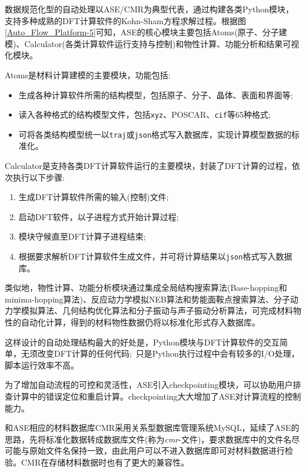 数据规范化型的自动处理以\textrm{ASE/CMR}为典型代表，通过构建各类\textrm{Python}模块，支持多种成熟的\textrm{DFT}计算软件的\textrm{Kohn-Sham}方程求解过程。根据图\ref{Auto_Flow_Platform-5}可知，\textrm{ASE}的核心模块主要包括\textrm{Atoms}(原子、分子建模)、\textrm{Calculator}(各类计算软件运行支持与控制)和物性计算、功能分析和结果可视化模块。

\textrm{Atoms}是材料计算建模的主要模块，功能包括:
\begin{itemize}
	\item 生成各种计算软件所需的结构模型，包括原子、分子、晶体、表面和界面等;
	\item 读入各种格式的结构模型文件，包括\texttt{xyz}、\textrm{POSCAR}、\texttt{cif}等65种格式;
	\item 可将各类结构模型统一以\texttt{traj}或\texttt{json}格式写入数据库，实现计算模型数据的标准化。
\end{itemize}

\textrm{Calculator}是支持各类\textrm{DFT}计算软件运行的主要模块，封装了\textrm{DFT}计算的过程，依次执行以下步骤:
\begin{enumerate}
	\item 生成\textrm{DFT}计算软件所需的输入(控制)文件;
	\item 启动\textrm{DFT}软件，以子进程方式开始计算过程;
	\item 模块守候直至\textrm{DFT}计算子进程结束;
	\item 根据要求解析\textrm{DFT}计算软件生成文件，并可将计算结果以\texttt{json}格式写入数据库。
\end{enumerate}
类似地，物性计算、功能分析模块通过集成全局结构搜索算法(\textrm{Base-hopping}和\textrm{minima-hopping}算法)、反应动力学模拟\textrm{NEB}算法和势能面鞍点搜索算法、分子动力学模拟算法、几何结构优化算法和分子振动与声子振动分析算法，可完成材料物性的自动化计算，得到的材料物性数据仍将以标准化形式存入数据库。

这样设计的自动处理结构最大的好处是，\textrm{Python}模块与\textrm{DFT}计算软件的交互简单，无须改变\textrm{DFT}计算的任何代码;~只是\textrm{Python}执行过程中会有较多的\textrm{I/O}处理，脚本运行效率不高。

为了增加自动流程的可控和灵活性，\textrm{ASE}引入\textrm{checkpointing}模块，可以协助用户排查计算中的错误定位和重启计算。\textrm{checkpointing}大大增加了\textrm{ASE}对计算流程的控制能力。

和\textrm{ASE}相应的材料数据库\textrm{CMR}采用关系型数据库管理系统\textrm{MySQL}，延续了\textrm{ASE}的思路，先将标准化数据转成数据库文件(称为\textit{cmr}-文件)，要求数据库中的文件名尽可能与原始文件名保持一致，由此用户可以不进入数据库即可对材料数据进行检验。\textrm{CMR}在存储材料数据时也有了更大的兼容性。

